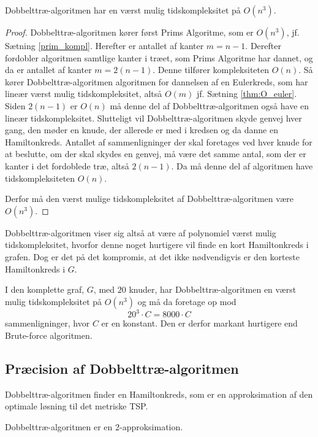 \begin{thm}
Dobbelttræ-algoritmen har en værst mulig tidskompleksitet på $O(n^3)$.
\end{thm}

\begin{proof}
Dobbelttræ-algoritmen kører først Prims Algoritme, som er $O(n^3)$, jf. Sætning \ref{prim_kompl}. 
Herefter er antallet af kanter $m=n-1$.
Derefter fordobler algoritmen samtlige kanter i træet, som Prims Algoritme har dannet, og da er antallet af kanter $m=2(n-1)$.
	Denne tilfører kompleksiteten $O(n)$.
	Så kører Dobbelttræ-algoritmen algoritmen for dannelsen af en Eulerkreds, som har lineær værst mulig tidskompleksitet, altså $O(m)$ jf. Sætning \ref{thm:O_euler}. 
Siden $2(n-1)$ er $O(n)$ må denne del af Dobbelttræ-algoritmen også have en lineær tidskompleksitet.
Slutteligt vil Dobbelttræ-algoritmen skyde genvej hver gang, den møder en knude, der allerede er med i kredsen og da danne en Hamiltonkreds. Antallet af sammenligninger der skal foretages ved hver knude for at beslutte, om der skal skydes en genvej, må være det samme antal, som der er kanter i det fordoblede træ, altså $2(n-1)$.
	Da må denne del af algoritmen have tidskompleksiteten $O(n)$.

	Derfor må den værst mulige tidskompleksitet af Dobbelttræ-algoritmen være $O(n^3)$.
\end{proof}

Dobbelttræ-algoritmen viser sig altså at være af polynomiel værst mulig tidskompleksitet, hvorfor denne noget hurtigere vil finde en kort Hamiltonkreds i grafen. Dog er det på det kompromis, at det ikke nødvendigvis er den korteste Hamiltonkreds i $G$.

\begin{exmp}
I den komplette graf, $G$, med $20$ knuder, har Dobbelttræ-algoritmen en værst mulig tidskompleksitet på $O(n^3)$ og må da foretage op mod $$20^3 \cdot C= 8000 \cdot C$$ sammenligninger, hvor $C$ er en konstant. Den er derfor markant hurtigere end Brute-force algoritmen.
\end{exmp}

\subsection{Præcision af Dobbelttræ-algoritmen}
Dobbelttræ-algoritmen finder en Hamiltonkreds, som er en approksimation af den optimale løsning til det metriske TSP.

\begin{thm}
Dobbelttræ-algoritmen er en 2-approksimation.
\end{thm}

